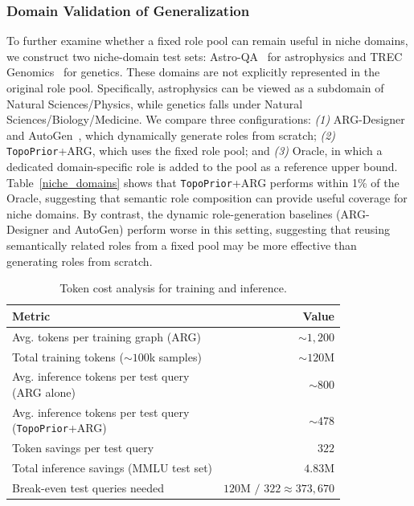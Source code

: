 \documentclass[lettersize,journal]{IEEEtran}
\theoremstyle{plain}
\begin{document}
\subsubsection{Domain Validation of Generalization}
To further examine whether a fixed role pool can remain useful in niche domains, we construct two niche-domain test sets: Astro-QA~\cite{astro_qa} for astrophysics and TREC Genomics~\cite{Hersh2007TREC2G} for genetics. These domains are not explicitly represented in the original role pool. Specifically, astrophysics can be viewed as a subdomain of Natural Sciences/Physics, while genetics falls under Natural Sciences/Biology/Medicine. We compare three configurations: \textit{(1)} ARG-Designer and AutoGen~\cite{wu2024autogen}, which dynamically generate roles from scratch; \textit{(2)} \texttt{TopoPrior}+ARG, which uses the fixed role pool; and \textit{(3)} Oracle, in which a dedicated domain-specific role is added to the pool as a reference upper bound.
Table~\ref{niche_domains} shows that \texttt{TopoPrior}+ARG performs within 1\% of the Oracle, suggesting that semantic role composition can provide useful coverage for niche domains. By contrast, the dynamic role-generation baselines (ARG-Designer and AutoGen) perform worse in this setting, suggesting that reusing semantically related roles from a fixed pool may be more effective than generating roles from scratch.




\begin{table}[!t]
\caption{Token cost analysis for training and inference.}
\small
\setlength{\tabcolsep}{4pt}
\renewcommand{\arraystretch}{1.15}
\begin{tabular}{l r}
\toprule
\textbf{Metric} & \textbf{Value} \\
\midrule
Avg. tokens per training graph (ARG) & $\sim 1{,}200$ \\
Total training tokens ($\sim 100$k samples) & $\sim 120$M \\
\makecell[l]{Avg. inference tokens per test query \\ (ARG alone)} & $\sim 800$ \\
\makecell[l]{Avg. inference tokens per test query \\ (\texttt{TopoPrior}+ARG)} & $\sim 478$ \\
Token savings per test query & $322$ \\
Total inference savings (MMLU test set) & $4.83$M \\
Break-even test queries needed & $120$M $/$ $322 \approx 373{,}670$ \\
\bottomrule
\end{tabular}
\label{token_breakdown}
\flushleft
\vspace{-1em}
\end{table}
\end{document}
